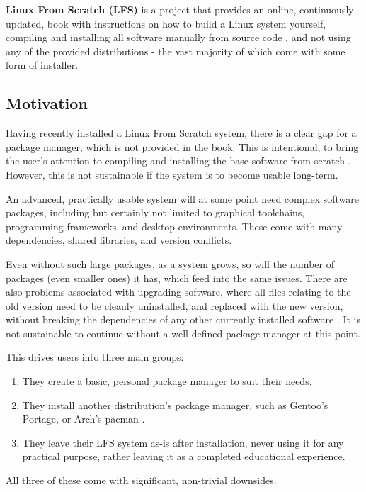 \documentclass[10pt]{article}
\begin{document}
\textbf{Linux From Scratch (LFS)} is a project that provides an online, continuously updated, book with instructions on how to build a Linux system yourself, compiling and installing all software manually from source code \cite{LFSHome}, and not using any of the provided distributions - the vast majority of which come with some form of installer.

\subsection{Motivation} \label{MotivationSS}

Having recently installed a Linux From Scratch system, there is a clear gap for a package manager, which is not provided in the book. This is intentional, to bring the user's attention to compiling and installing the base software from scratch \cite{LFSPkgMgt}. However, this is not sustainable if the system is to become usable long-term.

An advanced, practically usable system will at some point need complex software packages, including but certainly not limited to graphical toolchains, programming frameworks, and desktop environments. These come with many dependencies, shared libraries, and version conflicts.

Even without such large packages, as a system grows, so will the number of packages (even smaller ones) it has, which feed into the same issues. There are also problems associated with upgrading software, where all files relating to the old version need to be cleanly uninstalled, and replaced with the new version, without breaking the dependencies of any other currently installed software \cite{LFSPkgMgt}. It is not sustainable to continue without a well-defined package manager at this point.

This drives users into three main groups:
\begin{enumerate}
    \item They create a basic, personal package manager to suit their needs.
    \item They install another distribution's package manager, such as Gentoo's Portage, or Arch's pacman \cite{GitHubLfsPacman}.
    \item They leave their LFS system as-is after installation, never using it for any practical purpose, rather leaving it as a completed educational experience.
\end{enumerate}

All three of these come with significant, non-trivial downsides.
\end{document}

